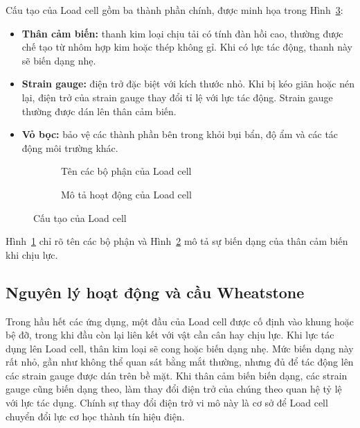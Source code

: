 Cấu tạo của Load cell gồm ba thành phần chính, được minh họa trong Hình~\ref{fig:c2:cau-tao}:
\begin{itemize}
    \item \textbf{Thân cảm biến:} thanh kim loại chịu tải có tính đàn hồi cao, thường được chế tạo từ
          nhôm hợp kim hoặc thép không gỉ. Khi có lực tác động, thanh này sẽ biến dạng nhẹ.
    \item \textbf{Strain gauge:} điện trở đặc biệt với kích thước nhỏ. Khi bị kéo giãn hoặc nén lại,
          điện trở của strain gauge thay đổi tỉ lệ với lực tác động. Strain gauge thường được dán lên
          thân cảm biến.
    \item \textbf{Vỏ bọc:} bảo vệ các thành phần bên trong khỏi bụi bẩn, độ ẩm và các tác động môi
          trường khác.
\end{itemize}

\begin{figure}[H]
    \centering
    \begin{subfigure}[t]{0.85\textwidth}
        \centering
        \caption{Tên các bộ phận của Load cell}
        \label{fig:c2:cau-tao-bo-phan}
    \end{subfigure}

    \begin{subfigure}[t]{0.85\textwidth}
        \centering
        \caption{Mô tả hoạt động của Load cell}
        \label{fig:c2:cau-tao-hoat-dong}
    \end{subfigure}
    \caption{Cấu tạo của Load cell}
    \label{fig:c2:cau-tao}
\end{figure}

Hình~\ref{fig:c2:cau-tao-bo-phan} chỉ rõ tên các bộ phận và Hình~\ref{fig:c2:cau-tao-hoat-dong} mô tả
sự biến dạng của thân cảm biến khi chịu lực.

\subsection{Nguyên lý hoạt động và cầu Wheatstone}
\label{sec:c2:loadcell-nguyen-ly}

Trong hầu hết các ứng dụng, một đầu của Load cell được cố định vào khung hoặc bệ đỡ, trong khi đầu
còn lại liên kết với vật cần cân hay chịu lực. Khi lực tác dụng lên Load cell, thân kim loại sẽ cong
hoặc biến dạng nhẹ. Mức biến dạng này rất nhỏ, gần như không thể quan sát bằng mắt thường, nhưng đủ
để tác động lên các strain gauge được dán trên bề mặt. Khi thân cảm biến biến dạng, các strain gauge
cũng biến dạng theo, làm thay đổi điện trở của chúng theo quan hệ tỷ lệ với lực tác dụng. Chính sự
thay đổi điện trở vi mô này là cơ sở để Load cell chuyển đổi lực cơ học thành tín hiệu điện.

